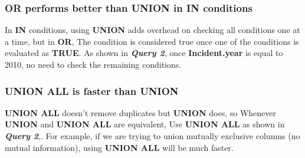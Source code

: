 \subsubsection{OR performs better than UNION in IN conditions}
In \textbf{IN} conditions, using \textbf{UNION} adds overhead on checking all conditions one at a time, but in \textbf{OR}, The condition is considered true once one of the conditions is evaluated as \textbf{TRUE}.
As shown in \textbf{\textit{Query 2}}, once \textbf{Incident.year} is equal to 2010, no need to check the remaining conditions.

\subsubsection{UNION ALL is faster than UNION}
\textbf{UNION ALL} doesn't remove duplicates but \textbf{UNION} does, so Whenever \textbf{UNION} and \textbf{UNION ALL} are equivalent, Use \textbf{UNION ALL} as shown in \textbf{\textit{Query 2}},. For example, if we are trying to union mutually exclusive columns (no mutual information), using \textbf{UNION ALL} will be much faster.


